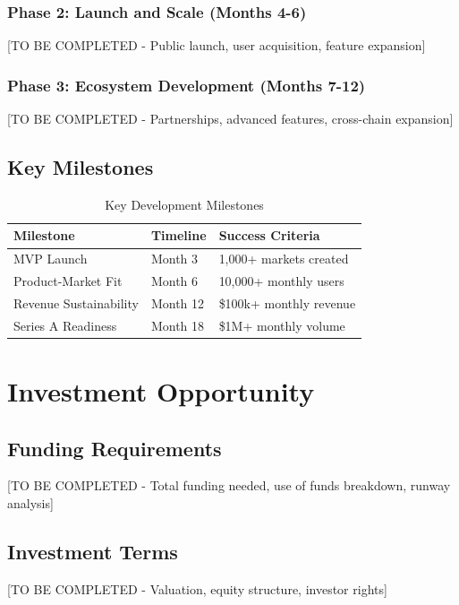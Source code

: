 \documentclass[11pt,a4paper]{article}
\begin{document}
\subsubsection{Phase 2: Launch and Scale (Months 4-6)}
[TO BE COMPLETED - Public launch, user acquisition, feature expansion]

\subsubsection{Phase 3: Ecosystem Development (Months 7-12)}
[TO BE COMPLETED - Partnerships, advanced features, cross-chain expansion]

\subsection{Key Milestones}

\begin{table}[h]
    \centering
    \begin{tabular}{@{}lll@{}}
        \toprule
        Milestone & Timeline & Success Criteria \\
        \midrule
        MVP Launch & Month 3 & 1,000+ markets created \\
        Product-Market Fit & Month 6 & 10,000+ monthly users \\
        Revenue Sustainability & Month 12 & \$100k+ monthly revenue \\
        Series A Readiness & Month 18 & \$1M+ monthly volume \\
        \bottomrule
    \end{tabular}
    \caption{Key Development Milestones}
    \label{tab:milestones}
\end{table}

\section{Investment Opportunity}

\subsection{Funding Requirements}
[TO BE COMPLETED - Total funding needed, use of funds breakdown, runway analysis]

\subsection{Investment Terms}
[TO BE COMPLETED - Valuation, equity structure, investor rights]
\end{document}
